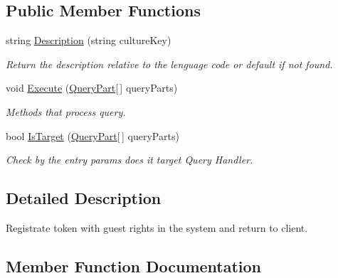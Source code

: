 \subsection*{Public Member Functions}
\begin{DoxyCompactItemize}
\item 
string \mbox{\hyperlink{class_authority_controller_1_1_queries_1_1_g_e_t___g_u_e_s_t___t_o_k_e_n_a72902cb3b94f31ec4f8e6cd0bb1f2ed8}{Description}} (string culture\+Key)
\begin{DoxyCompactList}\small\item\em Return the description relative to the lenguage code or default if not found. \end{DoxyCompactList}\item 
void \mbox{\hyperlink{class_authority_controller_1_1_queries_1_1_g_e_t___g_u_e_s_t___t_o_k_e_n_a99b0dddf4ff45771e546ec0fa14b0aae}{Execute}} (\mbox{\hyperlink{struct_uniform_queries_1_1_query_part}{Query\+Part}}\mbox{[}$\,$\mbox{]} query\+Parts)
\begin{DoxyCompactList}\small\item\em Methods that process query. \end{DoxyCompactList}\item 
bool \mbox{\hyperlink{class_authority_controller_1_1_queries_1_1_g_e_t___g_u_e_s_t___t_o_k_e_n_a5606c5797e0a684a6bfbbd851f186268}{Is\+Target}} (\mbox{\hyperlink{struct_uniform_queries_1_1_query_part}{Query\+Part}}\mbox{[}$\,$\mbox{]} query\+Parts)
\begin{DoxyCompactList}\small\item\em Check by the entry params does it target Query Handler. \end{DoxyCompactList}\end{DoxyCompactItemize}


\subsection{Detailed Description}
Registrate token with guest rights in the system and return to client. 



\subsection{Member Function Documentation}
\mbox{\label{class_authority_controller_1_1_queries_1_1_g_e_t___g_u_e_s_t___t_o_k_e_n_a72902cb3b94f31ec4f8e6cd0bb1f2ed8}} 
